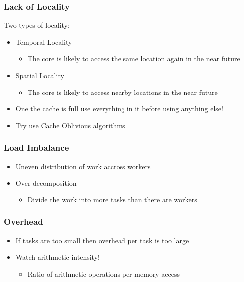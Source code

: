 \documentclass{beamer}
\begin{document}
\begin{frame}[fragile]
	\frametitle{Lack of Locality}
	Two types of locality:
\begin{itemize}
\item Temporal Locality
	\begin{itemize}
	\item The core is likely to access the same location again in the near future
	\end{itemize}
\item Spatial Locality
	\begin{itemize}
	\item The core is likely to access nearby locations in the near future
	\end{itemize}
\item One the cache is full use everything in it before using anything else!
\item Try use Cache Oblivious algorithms
	\end{itemize}
\end{frame}


\begin{frame}[fragile]
	\frametitle{Load Imbalance}
\begin{itemize}
\item Uneven distribution of work accross workers
\item Over-decomposition
	\begin{itemize}
	\item Divide the work into more tasks than there  are workers
	\end{itemize}
\end{itemize}
\end{frame}

\begin{frame}[fragile]
	\frametitle{Overhead}
\begin{itemize}
\item If tasks are too small then overhead per task is too large
\item Watch arithmetic intensity!
	\begin{itemize}
	\item Ratio of arithmetic operations per memory access
	\end{itemize}
\end{itemize}
\end{frame}
\end{document}

